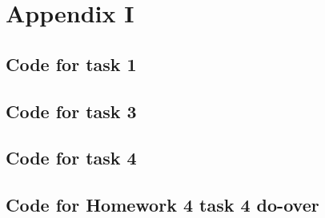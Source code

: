 \documentclass[]{article}
\begin{document}
\newpage
\section*{Appendix I}
\subsection*{Code for task 1}


\subsection*{Code for task 3}


\subsection*{Code for task 4}


\subsection*{Code for Homework 4 task 4 do-over}

\end{document}
